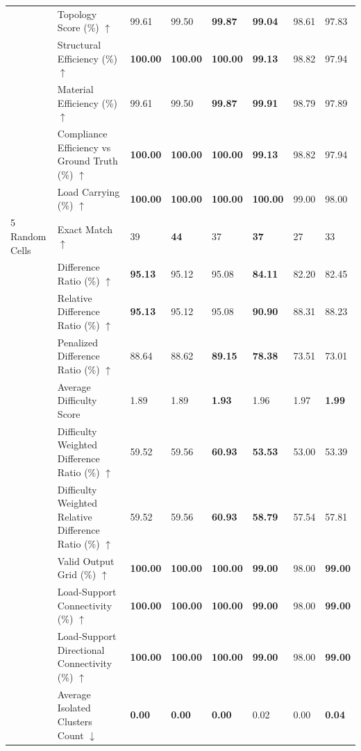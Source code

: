 \begin{table}[!h]
{\begin{tabular}{lllll|lll}
 & Topology Score (\%) $\uparrow$ & 99.61 & 99.50 & \textbf{99.87} & \textbf{99.04} & 98.61 & 97.83 \\
 & Structural Efficiency (\%) $\uparrow$ & \textbf{100.00} & \textbf{100.00} & \textbf{100.00} & \textbf{99.13} & 98.82 & 97.94 \\
 & Material Efficiency (\%) $\uparrow$ & 99.61 & 99.50 & \textbf{99.87} & \textbf{99.91} & 98.79 & 97.89 \\
 & Compliance Efficiency vs Ground Truth (\%) $\uparrow$ & \textbf{100.00} & \textbf{100.00} & \textbf{100.00} & \textbf{99.13} & 98.82 & 97.94 \\
 & Load Carrying (\%) $\uparrow$ & \textbf{100.00} & \textbf{100.00} & \textbf{100.00} & \textbf{100.00} & 99.00 & 98.00 \\
\midrule
5 Random Cells & Exact Match $\uparrow$ & 39 & \textbf{44} & 37 & \textbf{37} & 27 & 33 \\
 & Difference Ratio (\%) $\uparrow$ & \textbf{95.13} & 95.12 & 95.08 & \textbf{84.11} & 82.20 & 82.45 \\
 & Relative Difference Ratio (\%) $\uparrow$ & \textbf{95.13} & 95.12 & 95.08 & \textbf{90.90} & 88.31 & 88.23 \\
 & Penalized Difference Ratio (\%) $\uparrow$ & 88.64 & 88.62 & \textbf{89.15} & \textbf{78.38} & 73.51 & 73.01 \\
 & Average Difficulty Score & 1.89 & 1.89 & \textbf{1.93} & 1.96 & 1.97 & \textbf{1.99} \\
 & Difficulty Weighted Difference Ratio (\%) $\uparrow$ & 59.52 & 59.56 & \textbf{60.93} & \textbf{53.53} & 53.00 & 53.39 \\
 & Difficulty Weighted Relative Difference Ratio (\%) $\uparrow$ & 59.52 & 59.56 & \textbf{60.93} & \textbf{58.79} & 57.54 & 57.81 \\
 & Valid Output Grid (\%) $\uparrow$ & \textbf{100.00} & \textbf{100.00} & \textbf{100.00} & \textbf{99.00} & 98.00 & \textbf{99.00} \\
 & Load-Support Connectivity (\%) $\uparrow$ & \textbf{100.00} & \textbf{100.00} & \textbf{100.00} & \textbf{99.00} & 98.00 & \textbf{99.00} \\
 & Load-Support Directional Connectivity (\%) $\uparrow$ & \textbf{100.00} & \textbf{100.00} & \textbf{100.00} & \textbf{99.00} & 98.00 & \textbf{99.00} \\
 & Average Isolated Clusters Count $\downarrow$ & \textbf{0.00} & \textbf{0.00} & \textbf{0.00} & 0.02 & 0.00 & \textbf{0.04} \\

\end{tabular}}
\end{table}

